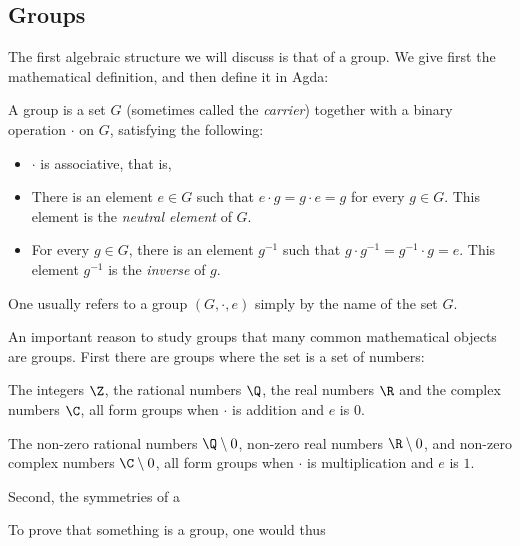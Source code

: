 \subsection{Groups}
The first algebraic structure we will discuss is that of a group. We give first the mathematical definition, and then define it in Agda:
\begin{Definition}
A group is a set $G$ (sometimes called the \emph{carrier}) together with a binary operation $\cdot$ on $G$, satisfying the following:
\begin{itemize}
\item $\cdot$ is associative, that is, 
\item There is an element $e \in G$ such that $e \cdot g = g \cdot e = g$ for every $g \in G$. This element is the \emph{neutral element} of $G$.
\item For every $g \in G$, there is an element $g^{-1}$ such that $g \cdot g^{-1} = g^{-1} \cdot g = e$. This element $g^{-1}$ is the \emph{inverse} of $g$.
\end{itemize}
\end{Definition}
\begin{Remark}
One usually refers to a group $(G, \cdot, e)$ simply by the name of the set $G$.
\end{Remark}
An important reason to study groups that many common mathematical objects are groups. First there are groups where the set is a set of numbers:
\begin{Example}
  The integers $\Z$, the rational numbers $\Q$, the real numbers $\R$ and the complex numbers $\C$, all form groups when $\cdot$ is addition and $e$ is $0$.
\end{Example}
\begin{Example}
  The non-zero rational numbers $\Q\setminus{0}$, non-zero real numbers $\R\setminus{0}$, and non-zero complex numbers $\C\setminus{0}$, all form groups when $\cdot$ is multiplication and $e$ is $1$.
\end{Example}
Second, the symmetries of a 

To prove that something is a group, one would thus

